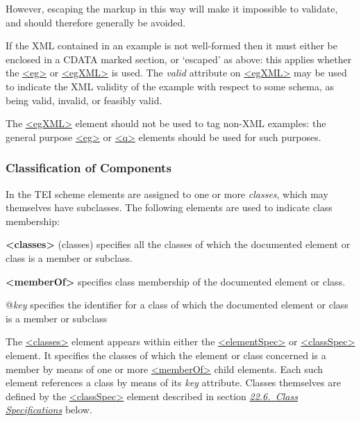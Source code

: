  However, escaping the markup in this way will make it impossible to validate, and should therefore generally be avoided.\par
If the XML contained in an example is not well-formed then it must either be enclosed in a CDATA marked section, or ‘escaped’ as above: this applies whether the \hyperref[TEI.eg]{<eg>} or \hyperref[TEI.egXML]{<egXML>} is used. The {\itshape valid} attribute on \hyperref[TEI.egXML]{<egXML>} may be used to indicate the XML validity of the example with respect to some schema, as being valid, invalid, or feasibly valid.\par
The \hyperref[TEI.egXML]{<egXML>} element should not be used to tag non-XML examples: the general purpose \hyperref[TEI.eg]{<eg>} or \hyperref[TEI.q]{<q>} elements should be used for such purposes.
\subsubsection[{Classification of Components}]{Classification of Components}\label{TDcrystalsCEcl}\par
In the TEI scheme elements are assigned to one or more \textit{classes}, which may themselves have subclasses. The following elements are used to indicate class membership: 
\begin{sansreflist}
  
\item [\textbf{<classes>}] (classes) specifies all the classes of which the documented element or class is a member or subclass.
\item [\textbf{<memberOf>}] specifies class membership of the documented element or class.\hfil\\[-10pt]\begin{sansreflist}
    \item[@{\itshape key}]
  specifies the identifier for a class of which the documented element or class is a member or subclass
\end{sansreflist}  
\end{sansreflist}
\par
The \hyperref[TEI.classes]{<classes>} element appears within either the \hyperref[TEI.elementSpec]{<elementSpec>} or \hyperref[TEI.classSpec]{<classSpec>} element. It specifies the classes of which the element or class concerned is a member by means of one or more \hyperref[TEI.memberOf]{<memberOf>} child elements. Each such element references a class by means of its {\itshape key} attribute. Classes themselves are defined by the \hyperref[TEI.classSpec]{<classSpec>} element described in section \textit{\hyperref[TDCLA]{22.6.\ Class Specifications}} below.\par
